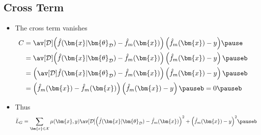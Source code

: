 \begin{slide}
\section{Cross Term}

\begin{PauseHighLight}
  \begin{itemize}
  \item The cross term vanishes
  \begin{align*}
  C &= \av[\mathcal{D}]{ \left(\hat{f}(\bm{x}\vert \bm{\theta}_{\mathcal{D}}) -
              \hat{f}_m(\bm{x}) \right) \left(\hat{f}_m(\bm{x}) - y \right) }\pause\\
     &= \av[\mathcal{D}]{ \left(\hat{f}(\bm{x}\vert \bm{\theta}_{\mathcal{D}}) -
              \hat{f}_m(\bm{x}) \right) } \left( \hat{f}_m(\bm{x}) - y \right) \pauseb\\
    &= \left(\av[\mathcal{D}]{\hat{f}(\bm{x}\vert \bm{\theta}_{\mathcal{D}})} -
              \hat{f}_m(\bm{x}) \right) \left(\hat{f}_m(\bm{x}) - y \right)\pauseb\\
     &= \left(\hat{f}_m(\bm{x}) -
              \hat{f}_m(\bm{x}) \right)\left(
              \hat{f}_m(\bm{x}) - y \right)\pauseb
              = 0\pauseb
  \end{align*}
  \item Thus
  \begin{align*}
   \bar{L}_G &= \sum_{\bm{x}\in\mathcal{X}} \mu(\bm{x},y)
              \av[\mathcal{D}]{ 
              \left(\hat{f}(\bm{x}\vert \bm{\theta}_{\mathcal{D}}) -
              \hat{f}_m(\bm{x}) \right)^2 + \left(
              \hat{f}_m(\bm{x}) - y \right)^2 }\pauseb
  \end{align*}
  \end{itemize}
\end{PauseHighLight}

\end{slide}




